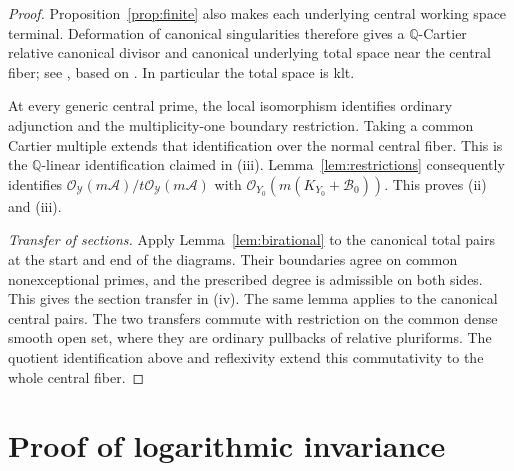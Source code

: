\documentclass[11pt,a4paper]{article}
\numberwithin{equation}{section}
\theoremstyle{definition}
\theoremstyle{remark}
\newcommand{\Q}{\mathbb Q}\newcommand{\R}{\mathbb R}
\newcommand{\OO}{\mathcal O}\newcommand{\cX}{\mathcal X}
\newcommand{\cY}{\mathcal Y}\newcommand{\cB}{\mathcal B}
\newcommand{\cA}{\mathcal A}\newcommand{\cF}{\mathcal F}
\begin{document}
\begin{proof}
Proposition~\ref{prop:finite} also makes each underlying central
working space terminal. Deformation of canonical singularities
therefore gives a $\Q$-Cartier relative canonical divisor and
canonical underlying total space near the central fiber;
see \cite[Lemma~10 and Remark~10.3]{Kollar2021}, based on
\cite[Theorem~VI.5.2]{Nakayama2004}. In particular the total space
is klt.

At every generic central prime, the local isomorphism identifies
ordinary adjunction and the multiplicity-one boundary restriction. Taking a common Cartier multiple extends that
identification over the normal central fiber. This is the
$\Q$-linear identification claimed in (iii). Lemma~\ref{lem:restrictions} consequently identifies
$\OO_{\cY}(m\cA)/t\OO_{\cY}(m\cA)$ with
$\OO_{Y_0}(m(K_{Y_0}+\cB_0))$. This proves (ii) and (iii).

\smallskip\noindent\emph{Transfer of sections.}
Apply Lemma~\ref{lem:birational} to the canonical total
pairs at the start and end of the diagrams. Their boundaries agree
on common nonexceptional primes, and the prescribed degree is
admissible on both sides. This gives the section transfer in (iv).
The same lemma applies to the canonical central pairs. The two
transfers commute with restriction on the common dense smooth open
set, where they are ordinary pullbacks of relative pluriforms.
The quotient identification above and reflexivity extend this
commutativity to the whole central fiber.
\end{proof}

\section{Proof of logarithmic invariance}\label{sec:main-proof}
\end{document}
